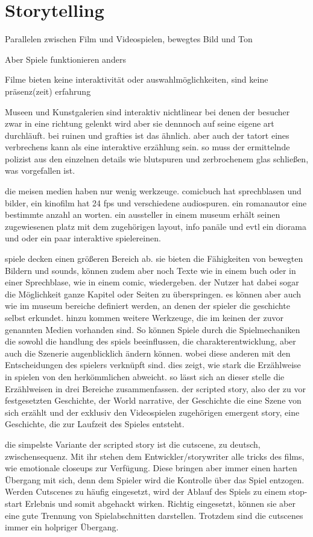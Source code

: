 

\section{Storytelling} 
Parallelen zwischen Film und Videospielen, bewegtes Bild und Ton

Aber Spiele funktionieren anders

Filme bieten keine interaktivität oder auswahlmöglichkeiten, sind keine präsenz(zeit) erfahrung

Museen und Kunstgalerien sind interaktiv nichtlinear bei denen der besucher zwar in eine richtung gelenkt wird aber sie dennnoch auf seine eigene art durchläuft. bei ruinen und grafties ist das ähnlich. 
aber auch der tatort eines verbrechens kann als eine interaktive erzählung sein. so muss der ermittelnde polizist aus den einzelnen details wie blutspuren und zerbrochenem glas schließen, was vorgefallen ist.


die meisen medien haben nur wenig werkzeuge.
comicbuch hat sprechblasen und bilder, ein kinofilm hat 24 fps und verschiedene audiospuren. ein romanautor eine bestimmte anzahl an worten. ein aussteller in einem museum erhält seinen zugewiesenen platz mit dem zugehörigen layout, info panäle und evtl ein diorama und oder ein paar interaktive spielereinen.

spiele decken einen größeren Bereich ab. sie bieten die Fähigkeiten von bewegten Bildern und sounds, können zudem aber noch Texte wie in einem buch oder in einer Sprechblase, wie in einem comic, wiedergeben. der Nutzer hat dabei sogar die Möglichkeit ganze Kapitel oder Seiten zu überspringen. es können aber auch wie im museum bereiche definiert werden, an denen der spieler die geschichte selbst erkundet. hinzu kommen weitere Werkzeuge, die im keinen der zuvor genannten Medien vorhanden sind. So können Spiele durch die Spielmechaniken die sowohl die handlung des spiels beeinflussen, die charakterentwicklung, aber auch die Szenerie augenblicklich ändern können. wobei diese anderen mit den Entscheidungen des spielers verknüpft sind.
dies zeigt, wie stark die Erzählweise in spielen von den herkömmlichen abweicht.
so lässt sich an dieser stelle die Erzählweisen in drei Bereiche zusammenfassen. der scripted story, also der zu vor festgesetzten Geschichte, der World narrative, der Geschichte die eine Szene von sich erzählt und der exklusiv den Videospielen zugehörigen emergent story, eine Geschichte, die zur Laufzeit des Spieles entsteht.

die simpelste Variante der scripted story ist die cutscene, zu deutsch, zwischensequenz. Mit ihr stehen dem Entwickler/storywriter alle tricks des films, wie emotionale closeups zur Verfügung. Diese bringen aber immer einen harten Übergang mit sich, denn dem Spieler wird die Kontrolle über das Spiel entzogen. Werden Cutscenes zu häufig eingesetzt, wird der Ablauf des Spiels zu einem stop-start Erlebnis und somit abgehackt wirken. Richtig eingesetzt, können sie aber eine gute Trennung von Spielabschnitten darstellen. Trotzdem sind die cutscenes immer ein holpriger Übergang. 

